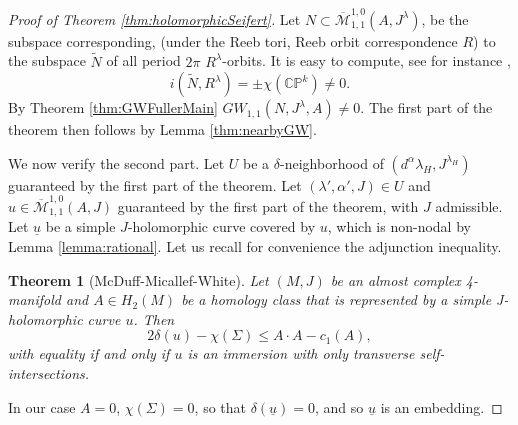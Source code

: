 \documentclass{amsart}
\numberwithin{equation}{section}
\newtheorem{theorem}[equation]{Theorem}
\theoremstyle{definition}
\theoremstyle{remark}
\begin{document}
\begin{proof} [Proof of Theorem \ref{thm:holomorphicSeifert}]
   Let $N \subset \overline{\mathcal{M}} ^{1,0}  _{1,1} (A, J ^{\lambda} )  $, be the subspace corresponding, (under the Reeb tori, Reeb orbit correspondence $R$) to the subspace $\widetilde{N} $ of all period $2 \pi$ $R ^{\lambda} $-orbits.  It is easy to compute, see for instance \cite{citeFullerIndex}, $$i (\widetilde{N}, R ^{\lambda}) = \pm \chi (\mathbb{CP} ^{k}) \neq 0.
   $$ By Theorem \ref{thm:GWFullerMain} $GW _{1,1} (N, J ^{\lambda}, A)  \neq 0 $. The first part of the theorem then follows by Lemma \ref{thm:nearbyGW}. 

We now verify the second part.
Let $U$ be a $\delta$-neighborhood of $(d ^{\alpha}\lambda _{H}, J ^{\lambda _{H}} )$ guaranteed by the first part of the theorem. Let $(\lambda', \alpha',J) \in U$ and $u \in \overline{\mathcal{M}} ^{1,0}  _{1,1} (A, J) $ guaranteed by the first part of the theorem, with $J$ admissible. 
   Let $\underline{u}$ be a simple $J$-holomorphic curve covered by $u$, which is non-nodal by Lemma \ref{lemma:rational}.
 Let us recall for convenience the adjunction inequality. 
\begin{theorem} [McDuff-Micallef-White] 
 Let $(M, J)$ be an almost complex 4-manifold and $A \in H_2(M)$ be a homology class that is represented by a simple J-holomorphic curve $u$.  Then 
\begin{equation*}
2\delta (u) - \chi (\Sigma) \leq A\cdot A -c _{1} (A),
\end{equation*}
with equality if and only if $u$  is an immersion with only transverse self-intersections. 
\end{theorem}
In our case  $A=0$, $\chi (\Sigma)=0$, so that $\delta (\underline{u})=0$, and so $\underline{u}$ is an embedding.
%
\end{proof}
\end{document}
